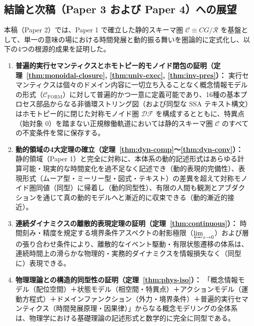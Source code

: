 \documentclass[11pt,a4paper]{ltjsarticle}
\theoremstyle{definition}
\theoremstyle{plain}
\theoremstyle{remark}
\newcommand{\DF}{\mathcal{DF}}
\newcommand{\Cform}{\mathcal{C}_{\mathrm{FORM}}}
\begin{document}
\subsection{結論と次稿（Paper 3 および Paper 4）への展望}
本稿（Paper 2）では、Paper 1 で確立した静的スキーマ圏 $\mathcal{C} \equiv CG/\mathcal{R}$ を基盤として、単一の意味の場における時間発展と動的振る舞いを圏論的に定式化し、以下の4つの根源的成果を証明した。
\begin{enumerate}
    \item \textbf{普遍的実行セマンティクスとホモトピー的モノイド閉包の証明（定理~\ref{thm:monoidal-closure}, \ref{thm:univ-exec}, \ref{thm:inv-pres}）：} 実行セマンティクスは個々のドメイン内容に一切立ち入ることなく概念情報モデルの形式（$\Cform$）に対して普遍的かつ一意に定義可能であり、16種の基本プロセス部品からなる非循環ストリング図（および同型な SSA テキスト構文）はホモトピー的に閉じた対称モノイド圏 $\DF$ を構成するとともに、特異点（始対象 $0$）を踏まない正規稼働軌道においては静的スキーマ圏 $\mathcal{C}$ のすべての不変条件を常に保存する。
    \item \textbf{動的領域の4大定理の確立（定理~\ref{thm:dyn-comp}〜\ref{thm:dyn-conv}）：} 静的領域（Paper 1）と完全に対称に、本体系の動的記述形式はあらゆる計算可能・現実的な時間変化を過不足なく記述でき（動的表現的完備性）、表現形式（ムーア型・ミーリー型・図式・テキスト）の差異を超えて対称モノイド圏同値（同型）に帰着し（動的同型性）、有限の人間も観測とアブダクションを通じて真の動的モデルへと漸近的に収束できる（動的漸近的接近）。
    \item \textbf{連続ダイナミクスの離散的表現定理の証明（定理~\ref{thm:continuous}）：} 時間刻み・精度を規定する境界条件アスペクトの射影極限（$\varprojlim_{\varepsilon \to 0}$）および層の張り合わせ条件により、離散的なイベント駆動・有限状態遷移の体系は、連続時間上の滑らかな物理的・実務的ダイナミクスを情報損失なく（同型に）表現できる。
    \item \textbf{物理理論との構造的同型性の証明（定理~\ref{thm:phys-iso}）：} 「概念情報モデル（配位空間）＋状態モデル（相空間・特異点）＋アクションモデル（運動方程式）＋ドメインファンクション（外力・境界条件）＋普遍的実行セマンティクス（時間発展原理・因果律）」からなる概念モデリングの全体系は、物理学における基礎理論の記述形式と数学的に完全に同型である。
\end{enumerate}
\end{document}
